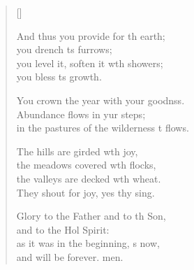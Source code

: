 \begin{verse}[\versewidth]
\begin{patverse}
And thus you provide for th earth;\Med\\
you drench \pointup{\i}ts furrows;\\
you level it, soften it w\pointup{\i}th showers;\Med\\
you bless \pointup{\i}ts growth.

You crown the year with your goodnss.\Flex\\
Abundance flows in yur steps;\Med\\
in the pastures of the wilderness \pointup{\i}t flows.

The hills are girded w\pointup{\i}th joy,\Med\\
the meadows covered w\pointup{\i}th flocks,\\
the valleys are decked w\pointup{\i}th wheat.\Med\\
They shout for joy, yes thy sing.

Glory to the Father and to th Son,\Med\\
and to the Hol Spirit:\\
as it was in the beginning, \pointup{\i}s now,\Med\\
and will be forever. men. 
  \end{patverse}
\end{verse}
